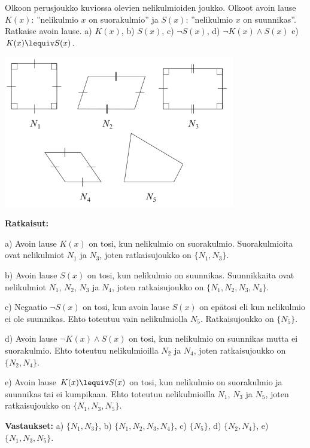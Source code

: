 \begin{esimerkki}
 Olkoon perusjoukko kuviossa olevien nelikulmioiden joukko. Olkoot avoin lause $K(x)$: ''nelikulmio $x$ on suorakulmio'' ja $S(x)$: ''nelikulmio $x$ on suunnikas''. Ratkaise avoin lause.  a)  $K(x)$,  b)  $S(x)$,  c) $\lnot S(x)$,  d)  $\lnot K(x) \land S(x)$  e)  $K(x) \lequiv S(x)$.

\begin{center}
\includegraphics[width=10.1cm]{pictures/kpl3_2_esim3}
\end{center}


{\bf Ratkaisut:}

a) Avoin lause $K(x)$ on tosi, kun nelikulmio on suorakulmio. Suorakulmioita ovat nelikulmiot $N_1$ ja $N_3$, joten ratkaisujoukko on $\{ N_1, N_3\}$.

b) Avoin lause $S(x)$ on tosi, kun nelikulmio on suunnikas. Suunnikkaita ovat nelikulmiot $N_1$, $N_2$, $N_3$ ja $N_4$, joten ratkaisujoukko on $\{ N_1, N_2, N_3, N_4\}$.

c) Negaatio $\lnot S(x)$ on tosi, kun avoin lause $S(x)$ on epätosi eli kun nelikulmio ei ole suunnikas. Ehto toteutuu vain nelikulmiolla $N_5$. Ratkaisujoukko on $\{N_5\}$.

d) Avoin lause $\lnot K(x) \land S(x)$ on tosi, kun nelikulmio on suunnikas mutta ei suorakulmio. Ehto toteutuu nelikulmioilla $N_2$ ja $N_4$, joten ratkaisujoukko on $\{ N_2, N_4\}$.

e) Avoin lause $K(x) \lequiv S(x)$ on tosi, kun nelikulmio on suorakulmio ja suunnikas tai ei kumpikaan. Ehto toteutuu nelikulmioilla $N_1$, $N_3$ ja $N_5$, joten ratkaisujoukko on $\{ N_1, N_3, N_5\}$.

{\bf Vastaukset:}   a)  $\{ N_1, N_3\}$,   b)  $\{ N_1, N_2, N_3, N_4\}$,   c)  $\{N_5\}$,  d)  $\{ N_2, N_4\}$,  e)  $\{ N_1, N_3, N_5\}$.
\end{esimerkki}

